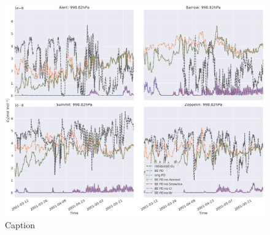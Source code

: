 \begin{figure}
    \centering
    \includegraphics[width = \linewidth]{Chapter6_Results/images/ozone_2001_testRemoveHetReacts.png}
    \caption{Caption}
    \label{fig:test_RemoveHetReacts}
\end{figure}